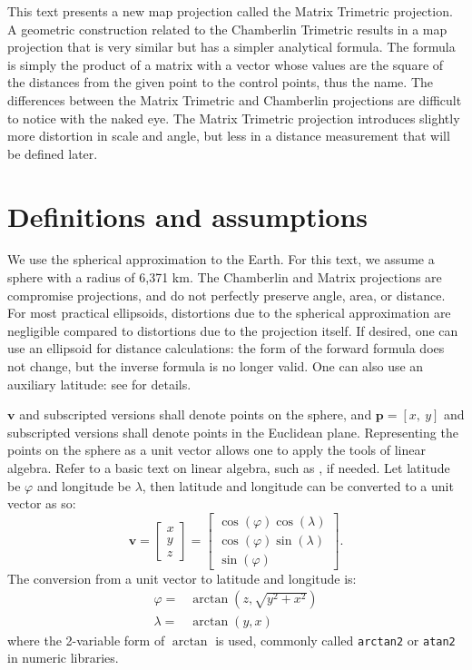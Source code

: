 \documentclass[]{interact}
\begin{document}
This text presents a new map projection called the Matrix Trimetric projection.
A geometric construction related to the Chamberlin Trimetric results in a map
projection that is very similar but has a simpler analytical formula. The
formula is simply the product of a matrix with a vector whose values are the
square of the distances from the given point to the control points, thus the
name. The differences between the Matrix Trimetric and Chamberlin projections
are difficult to notice with the naked eye. The Matrix Trimetric projection
introduces slightly more distortion in scale and angle, but less in a distance
measurement that will be defined later.

\section{Definitions and assumptions}
We use the spherical approximation to the Earth. For this text, we assume a
sphere with a radius of 6,371 km. The Chamberlin and Matrix projections are
compromise projections, and do not perfectly preserve angle, area, or distance.
For most practical ellipsoids, distortions due to the spherical approximation
are negligible compared to distortions due to the projection itself. If desired,
one can use an ellipsoid for distance calculations: the form of the forward
formula does not change, but the inverse formula is no longer valid. One can
also use an auxiliary latitude: see \citet{snyder87} for details.

$\mathbf v$ and subscripted versions shall denote points on the sphere, and
$\mathbf p = [x,~y]$ and subscripted versions shall denote points in the
Euclidean plane. Representing the points on the sphere as a unit vector allows
one to apply the tools of linear algebra. Refer to a basic text on linear
algebra, such as \citet{strang80}, if needed. Let latitude be $\varphi$ and
longitude be $\lambda$, then latitude and longitude can be converted to a unit
vector as so:
$$
\mathbf v =
\begin{bmatrix*}
  x \\y\\ z
\end{bmatrix*}
=
\begin{bmatrix*}
 \cos(\varphi) \cos(\lambda) \\
 \cos(\varphi) \sin(\lambda) \\
 \sin(\varphi)
\end{bmatrix*}.
$$
The conversion from a unit vector to latitude and longitude is:
\begin{equation}\begin{split}
  \varphi =& \arctan\left(z, \sqrt{y^2 + x^2}\right) \\
  \lambda =& \arctan\left(y, x\right)
\end{split}\end{equation}
where the 2-variable form of $\arctan$ is used, commonly called \texttt{arctan2}
or \texttt{atan2} in numeric libraries.
\end{document}
